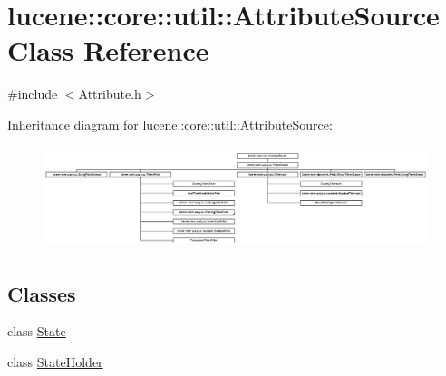 \hypertarget{classlucene_1_1core_1_1util_1_1AttributeSource}{}\section{lucene\+:\+:core\+:\+:util\+:\+:Attribute\+Source Class Reference}
\label{classlucene_1_1core_1_1util_1_1AttributeSource}


{\ttfamily \#include $<$Attribute.\+h$>$}

Inheritance diagram for lucene\+:\+:core\+:\+:util\+:\+:Attribute\+Source\+:\begin{figure}[H]
\begin{center}
\leavevmode
\includegraphics[height=3.020496cm]{classlucene_1_1core_1_1util_1_1AttributeSource}
\end{center}
\end{figure}
\subsection*{Classes}
\begin{DoxyCompactItemize}
\item 
class \mbox{\hyperlink{classlucene_1_1core_1_1util_1_1AttributeSource_1_1State}{State}}
\item 
class \mbox{\hyperlink{classlucene_1_1core_1_1util_1_1AttributeSource_1_1StateHolder}{State\+Holder}}
\end{DoxyCompactItemize}
